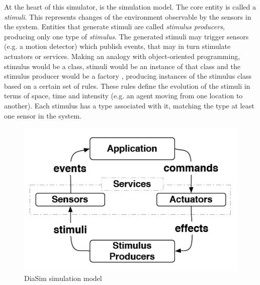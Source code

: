 At the heart of this simulator, is the simulation model. The core entity is called a \emph{stimuli}. This represents changes of the environment observable by the sensors in the system. Entities that generate stimuli are called \emph{stimulus producers}, producing only one type of \emph{stimulus}. The generated stimuli may trigger sensors (e.g. a motion detector) which publish events, that may in turn stimulate actuators or services. Making an analogy with object-oriented programming, stimulus would be a class, stimuli would be an instance of that class and the stimulus producer would be a factory \cite{gamma1994design}, producing instances of the stimulus class based on a certain set of rules. These rules define the evolution of the stimuli in terms of space, time and intensity (e.g. an agent moving from one location to another). Each stimulus has a type associated with it, matching the type at least one sensor in the system.\\

\begin{figure}[H]
	\centering
	\includegraphics[width=\linewidth]{gfx/Chapter2/diasim_simulation_model}
	\caption{DiaSim simulation model}
	\label{fig:diasim_simulation_model}
\end{figure}

